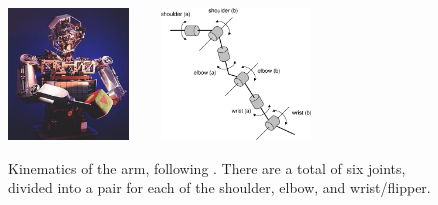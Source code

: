 \ifverbose
\begin{figure}[tbh]
\begin{center}
\includegraphics[height=3.5cm]{cog5-flip.eps}
\ \ \ \ 
\includegraphics[height=3.5cm]{arm-motors.eps}
\caption{ 
\label{fig:arm-motors}
%
Kinematics of the arm, following \protect\cite{williamson99robot}.
There are a total of six joints, divided into a pair for each of
the shoulder, elbow, and wrist/flipper.
%
}
\end{center}
\end{figure}
\fi
